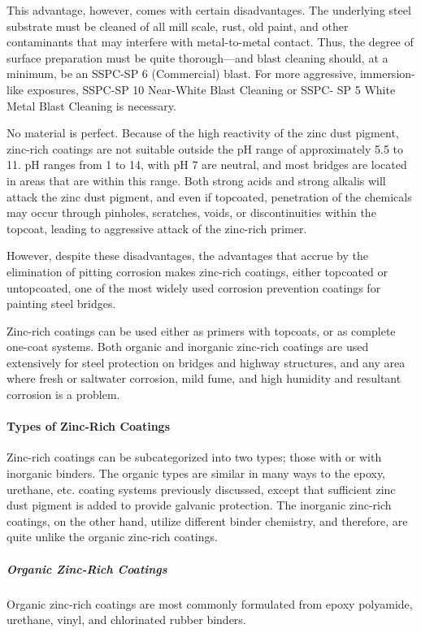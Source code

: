 This advantage, however, comes with certain disadvantages. The underlying steel substrate must be cleaned of all
mill scale, rust, old paint, and other contaminants that may interfere with metal-to-metal contact. Thus, the degree of
surface preparation must be quite thorough—and blast cleaning should, at a minimum, be an SSPC-SP 6
(Commercial) blast. For more aggressive, immersion-like exposures, SSPC-SP 10 Near-White Blast Cleaning or
SSPC- SP 5 White Metal Blast Cleaning is necessary.

No material is perfect. Because of the high reactivity of the zinc dust pigment, zinc-rich coatings are not suitable
outside the pH range of approximately 5.5 to 11. pH ranges from 1 to 14, with pH 7 are neutral, and most bridges are
located in areas that are within this range. Both strong acids and strong alkalis will attack the zinc dust pigment, and
even if topcoated, penetration of the chemicals may occur through pinholes, scratches, voids, or discontinuities
within the topcoat, leading to aggressive attack of the zinc-rich primer.

However, despite these disadvantages, the advantages that accrue by the elimination of pitting corrosion makes
zinc-rich coatings, either topcoated or untopcoated, one of the most widely used corrosion prevention coatings for
painting steel bridges.

Zinc-rich coatings can be used either as primers with topcoats, or as complete one-coat systems. Both organic
and inorganic zinc-rich coatings are used extensively for steel protection on bridges and highway structures, and any
area where fresh or saltwater corrosion, mild fume, and high humidity and resultant corrosion is a problem.


\paragraph{Types of Zinc-Rich Coatings}
Zinc-rich coatings can be subcategorized into two types; those with or with inorganic binders. The organic types
are similar in many ways to the epoxy, urethane, etc. coating systems previously discussed, except that sufficient zinc
dust pigment is added to provide galvanic protection. The inorganic zinc-rich coatings, on the other hand, utilize
different binder chemistry, and therefore, are quite unlike the organic zinc-rich coatings.

\subparagraph{Organic Zinc-Rich Coatings}
Organic zinc-rich coatings are most commonly formulated from epoxy polyamide, urethane, vinyl, and
chlorinated rubber binders.

